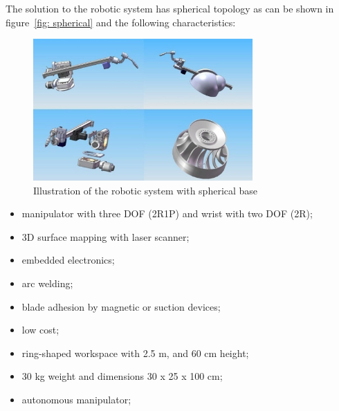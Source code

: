The solution to the robotic system has spherical topology as can be
shown in figure~\ref{fig: spherical} and the following characteristics:

\begin{figure}[ht]
\centering
\includegraphics[width=8.4cm]{figs/esferico/esferico.jpg}
\caption{Illustration of the robotic system with spherical base}
\label{fig:esferico}
\end{figure}

\begin{itemize}
   \item manipulator with three DOF (2R1P) and wrist with two DOF (2R);
   \item 3D surface mapping with laser scanner;
   \item embedded electronics;
   \item arc welding;
   \item blade adhesion by magnetic or suction devices;
   \item low cost;
   \item ring-shaped workspace with 2.5 m, and 60 cm height;
   \item 30 kg weight and dimensions 30 x 25 x 100 cm;
   \item autonomous manipulator;
\end{itemize}


